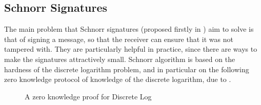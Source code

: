 \documentclass{article}
\begin{document}
\subsection{Schnorr Signatures}
The main problem that Schnorr signatures (proposed firstly in \cite{schnorrEfficientSignatureGeneration1991}) aim to
solve is that of signing a message, so that the receiver can ensure that it was not tampered with. They are particularly
helpful in practice, since there are ways to make the signatures attractively small. Schnorr algorithm is based on the hardness
of the discrete logarithm problem, and in particular on the following zero knowledge protocol of knowledge of the
discrete logarithm, due to \cite{chaumImprovedProtocolDemonstrating1988}.

\begin{figure}[H]
    \centering
    \caption{A zero knowledge proof for Discrete Log}
    \label{discretelog}
\end{figure}
\end{document}
